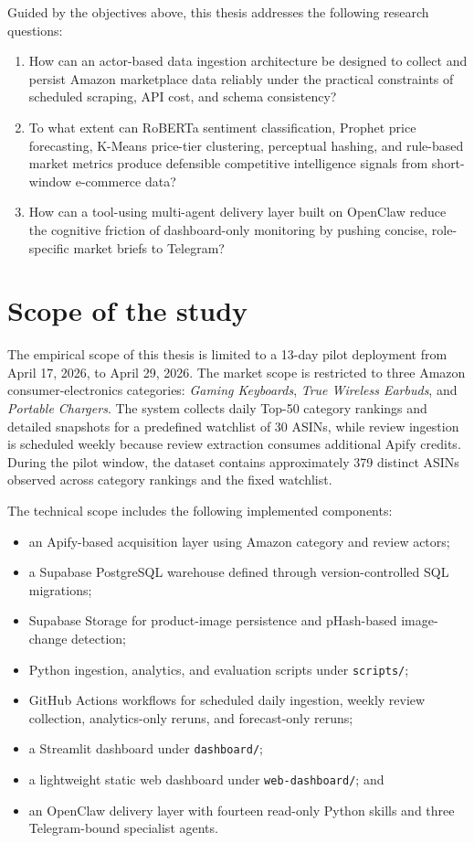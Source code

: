 Guided by the objectives above, this thesis addresses the following
research questions:
\begin{enumerate}
    \item How can an actor-based data ingestion architecture be designed
    to collect and persist Amazon marketplace data reliably under the
    practical constraints of scheduled scraping, API cost, and schema
    consistency?

    \item To what extent can RoBERTa sentiment classification, Prophet
    price forecasting, K-Means price-tier clustering, perceptual hashing,
    and rule-based market metrics produce defensible competitive
    intelligence signals from short-window e-commerce data?

    \item How can a tool-using multi-agent delivery layer built on
    OpenClaw reduce the cognitive friction of dashboard-only monitoring
    by pushing concise, role-specific market briefs to Telegram?
\end{enumerate}

\section{Scope of the study}

The empirical scope of this thesis is limited to a 13-day pilot
deployment from April 17, 2026, to April 29, 2026. The market scope is
restricted to three Amazon consumer-electronics categories:
\textit{Gaming Keyboards}, \textit{True Wireless Earbuds}, and
\textit{Portable Chargers}. The system collects daily Top-50 category
rankings and detailed snapshots for a predefined watchlist of 30 ASINs,
while review ingestion is scheduled weekly because review extraction
consumes additional Apify credits. During the pilot window, the dataset
contains approximately 379 distinct ASINs observed across category
rankings and the fixed watchlist.

The technical scope includes the following implemented components:
\begin{itemize}
    \item an Apify-based acquisition layer using Amazon category and
    review actors;
    \item a Supabase PostgreSQL warehouse defined through
    version-controlled SQL migrations;
    \item Supabase Storage for product-image persistence and
    pHash-based image-change detection;
    \item Python ingestion, analytics, and evaluation scripts under
    \texttt{scripts/};
    \item GitHub Actions workflows for scheduled daily ingestion,
    weekly review collection, analytics-only reruns, and forecast-only
    reruns;
    \item a Streamlit dashboard under \texttt{dashboard/};
    \item a lightweight static web dashboard under
    \texttt{web-dashboard/}; and
    \item an OpenClaw delivery layer with fourteen read-only Python
    skills and three Telegram-bound specialist agents.
\end{itemize}

